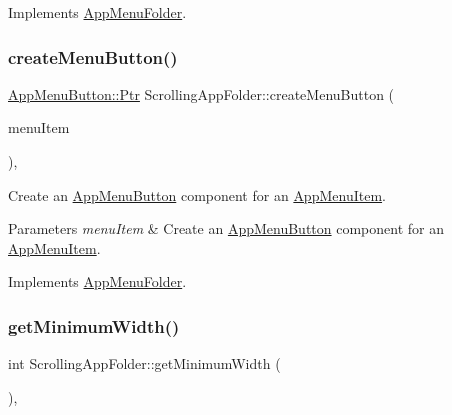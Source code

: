 Implements \mbox{\hyperlink{classAppMenuFolder}{App\+Menu\+Folder}}.

\mbox{\label{classScrollingAppFolder_a5e27c332bbccd63bef240ec1a542e83e}} 
\subsubsection{\texorpdfstring{create\+Menu\+Button()}{createMenuButton()}}
{\footnotesize\ttfamily \mbox{\hyperlink{classAppMenuButton_aeb692efb6a933970de8eac14e5e71544}{App\+Menu\+Button\+::\+Ptr}} Scrolling\+App\+Folder\+::create\+Menu\+Button (\begin{DoxyParamCaption}\item[{\mbox{\hyperlink{classAppMenuItem_ab5f51c5d74f8df62b8862c0cc8126cb7}{App\+Menu\+Item\+::\+Ptr}}}]{menu\+Item }\end{DoxyParamCaption})\hspace{0.3cm}{\ttfamily [override]}, {\ttfamily [virtual]}}

Create an \mbox{\hyperlink{classAppMenuButton}{App\+Menu\+Button}} component for an \mbox{\hyperlink{classAppMenuItem}{App\+Menu\+Item}}.


\begin{DoxyParams}{Parameters}
{\em menu\+Item} & Create an \mbox{\hyperlink{classAppMenuButton}{App\+Menu\+Button}} component for an \mbox{\hyperlink{classAppMenuItem}{App\+Menu\+Item}}. \\
\hline
\end{DoxyParams}


Implements \mbox{\hyperlink{classAppMenuFolder_a001ecdee13bf394746b5d0b49dcc55cc}{App\+Menu\+Folder}}.

\mbox{\label{classScrollingAppFolder_aa70592d62c840b03bb1ad3602a34ef96}} 
\subsubsection{\texorpdfstring{get\+Minimum\+Width()}{getMinimumWidth()}}
{\footnotesize\ttfamily int Scrolling\+App\+Folder\+::get\+Minimum\+Width (\begin{DoxyParamCaption}{ }\end{DoxyParamCaption})\hspace{0.3cm}{\ttfamily [override]}, {\ttfamily [virtual]}}


